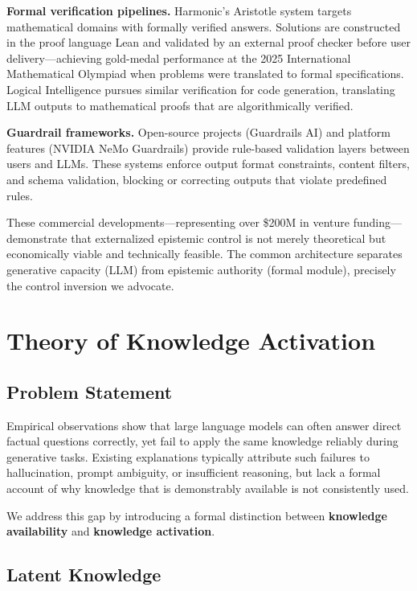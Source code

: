 \documentclass[11pt,a4paper]{article}
\begin{document}
\textbf{Formal verification pipelines.} Harmonic's Aristotle system targets mathematical domains with formally verified answers. Solutions are constructed in the proof language Lean and validated by an external proof checker before user delivery---achieving gold-medal performance at the 2025 International Mathematical Olympiad when problems were translated to formal specifications. Logical Intelligence pursues similar verification for code generation, translating LLM outputs to mathematical proofs that are algorithmically verified.

\textbf{Guardrail frameworks.} Open-source projects (Guardrails AI) and platform features (NVIDIA NeMo Guardrails) provide rule-based validation layers between users and LLMs. These systems enforce output format constraints, content filters, and schema validation, blocking or correcting outputs that violate predefined rules.

These commercial developments---representing over \$200M in venture funding---demonstrate that externalized epistemic control is not merely theoretical but economically viable and technically feasible. The common architecture separates generative capacity (LLM) from epistemic authority (formal module), precisely the control inversion we advocate.


\section{Theory of Knowledge Activation}

\subsection{Problem Statement}

Empirical observations show that large language models can often answer direct factual questions correctly, yet fail to apply the same knowledge reliably during generative tasks. Existing explanations typically attribute such failures to hallucination, prompt ambiguity, or insufficient reasoning, but lack a formal account of why knowledge that is demonstrably available is not consistently used.

We address this gap by introducing a formal distinction between \textbf{knowledge availability} and \textbf{knowledge activation}.

\subsection{Latent Knowledge}
\end{document}
